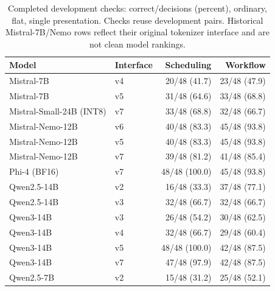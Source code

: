 \begin{table}[ht]
\centering
\caption{Completed development checks: correct/decisions (percent), ordinary, flat, single presentation. Checks reuse development pairs. Historical Mistral-7B/Nemo rows reflect their original tokenizer interface and are not clean model rankings.}
\label{tab:competence}
\small
\begin{tabular}{llrr}
\hline
Model & Interface & Scheduling & Workflow\\
\hline
Mistral-7B & v4 & 20/48 (41.7) & 23/48 (47.9)\\
Mistral-7B & v5 & 31/48 (64.6) & 33/48 (68.8)\\
Mistral-Small-24B (INT8) & v7 & 33/48 (68.8) & 32/48 (66.7)\\
Mistral-Nemo-12B & v6 & 40/48 (83.3) & 45/48 (93.8)\\
Mistral-Nemo-12B & v5 & 40/48 (83.3) & 45/48 (93.8)\\
Mistral-Nemo-12B & v7 & 39/48 (81.2) & 41/48 (85.4)\\
Phi-4 (BF16) & v7 & 48/48 (100.0) & 45/48 (93.8)\\
Qwen2.5-14B & v2 & 16/48 (33.3) & 37/48 (77.1)\\
Qwen2.5-14B & v3 & 32/48 (66.7) & 32/48 (66.7)\\
Qwen3-14B & v3 & 26/48 (54.2) & 30/48 (62.5)\\
Qwen3-14B & v4 & 32/48 (66.7) & 29/48 (60.4)\\
Qwen3-14B & v5 & 48/48 (100.0) & 42/48 (87.5)\\
Qwen3-14B & v7 & 47/48 (97.9) & 42/48 (87.5)\\
Qwen2.5-7B & v2 & 15/48 (31.2) & 25/48 (52.1)\\
\hline
\end{tabular}
\end{table}
